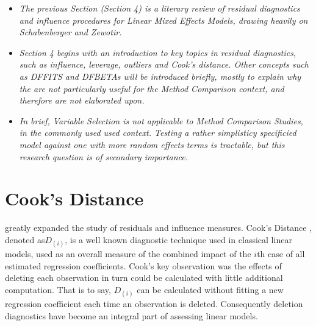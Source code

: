 \documentclass[12pt, a4paper]{article}
\begin{document}
\newpage
\begin{itemize}
	\item \textit{
		The previous Section (Section 4) is a literary review of residual diagnostics and influence procedures
		for Linear Mixed Effects Models, drawing heavily on Schabenberger and Zewotir.}
	
	\item \textit{	Section 4 begins with an introduction to key topics in residual diagnostics, such as influence, leverage, outliers
		and Cook's distance. Other concepts such as DFFITS and DFBETAs will be introduced briefly, mostly to explain why the are not particularly useful for
		the Method Comparison context, and therefore are not elaborated upon.}
	
	\item \textit{	In brief, Variable Selection is not applicable to Method Comparison Studies, in the 
		commonly used used context. 
		Testing a rather simplisticy specificied model against one with more random effects terms is tractable, but this research question is of secondary importance.}
\end{itemize}

\newpage


\section{Cook's Distance} %
%
\citet{cook77} greatly expanded the study of residuals and influence measures. Cook's Distance , denoted as$D_{(i)}$, is a well known diagnostic technique used in classical linear models, used as an overall measure of the combined impact of the $i$th case of all estimated regression coefficients. Cook's key observation was the effects of deleting each observation in turn could be calculated with little additional computation. That is to say, $D_{(i)}$ can be calculated without fitting a new regression coefficient each time an observation is deleted.  Consequently deletion diagnostics have become an integral part of assessing linear models. 
\end{document}
